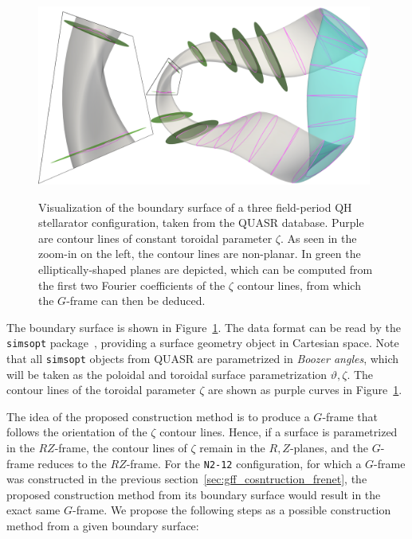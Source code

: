 \documentclass[12pt]{iopart}
\newcommand\hladdedrev[1]{#1} %
\newcommand\GFF{$G$-frame}
\newcommand\RZF{$RZ$-frame}
\newcommand{\thet}{\vartheta}
\newcommand\RZplanes[1]{$R,Z$-planes{#1}}
\begin{document}
\begin{figure}[htbp!]
    \centering
    \includegraphics[trim=0 0 0 0,clip,width=0.98\textwidth]{pics/quasr/quasr_visu_NBplanes_views.png}\\
    \caption{\hladdedrev{Visualization of the boundary surface of a three field-period QH stellarator configuration, taken from the QUASR database. Purple are contour lines of constant toroidal parameter $\zeta$. As seen in the zoom-in on the left, the contour lines are non-planar. In green the elliptically-shaped planes are depicted, which can be computed from the first two Fourier coefficients of the $\zeta$ contour lines, from which the  
     \GFF{} can then be deduced.}}
    \label{fig:quasr_init}
\end{figure}

\hladdedrev{The boundary surface is shown in Figure~\ref{fig:quasr_init}. The data format can be read by the \texttt{simsopt} package~\cite{simsopt-joss}, providing a surface geometry object in Cartesian space. 
Note that all \texttt{simsopt} objects from  QUASR are parametrized in \emph{Boozer angles}, which will be taken as the poloidal and toroidal surface parametrization $\thet,\zeta$. The contour lines of the toroidal parameter $\zeta$ are shown as purple curves in Figure~\ref{fig:quasr_init}.}

\hladdedrev{The idea of the proposed construction method is to produce a \GFF{} that follows the orientation of the $\zeta$ contour lines. Hence, if a surface is parametrized in the \RZF{}, the contour lines of $\zeta$ remain in the \RZplanes{}, and the \GFF{} reduces to the \RZF{}. For the \texttt{N2-12} configuration, for which a \GFF{} was constructed in the previous  section~\ref{sec:gff_cosntruction_frenet}, the proposed construction method from its boundary surface would result in the exact same \GFF{}. 
We propose the following steps as a possible construction method from a given boundary surface:}
\end{document}
